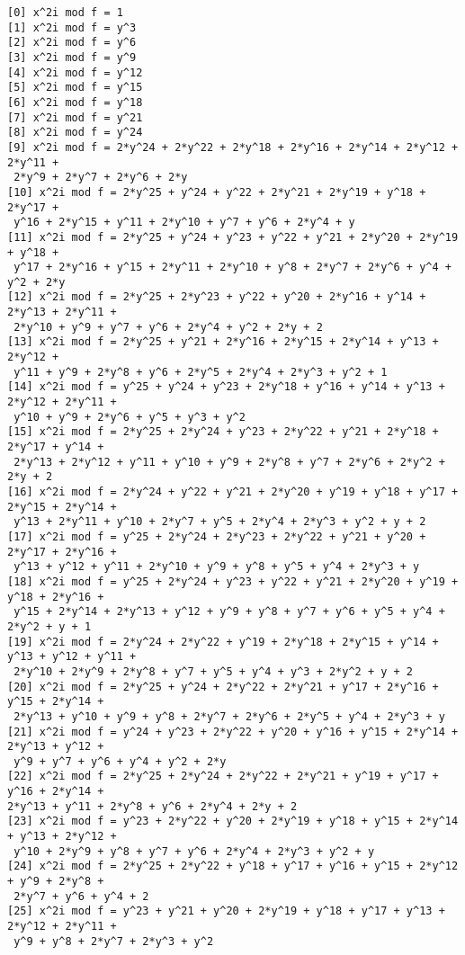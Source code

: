 \documentclass[a4paper]{article}
\begin{document}
\begin{verbatim}
[0] x^2i mod f = 1
[1] x^2i mod f = y^3
[2] x^2i mod f = y^6
[3] x^2i mod f = y^9
[4] x^2i mod f = y^12
[5] x^2i mod f = y^15
[6] x^2i mod f = y^18
[7] x^2i mod f = y^21
[8] x^2i mod f = y^24
[9] x^2i mod f = 2*y^24 + 2*y^22 + 2*y^18 + 2*y^16 + 2*y^14 + 2*y^12 + 2*y^11 +
 2*y^9 + 2*y^7 + 2*y^6 + 2*y
[10] x^2i mod f = 2*y^25 + y^24 + y^22 + 2*y^21 + 2*y^19 + y^18 + 2*y^17 +
 y^16 + 2*y^15 + y^11 + 2*y^10 + y^7 + y^6 + 2*y^4 + y
[11] x^2i mod f = 2*y^25 + y^24 + y^23 + y^22 + y^21 + 2*y^20 + 2*y^19 + y^18 +
 y^17 + 2*y^16 + y^15 + 2*y^11 + 2*y^10 + y^8 + 2*y^7 + 2*y^6 + y^4 + y^2 + 2*y
[12] x^2i mod f = 2*y^25 + 2*y^23 + y^22 + y^20 + 2*y^16 + y^14 + 2*y^13 + 2*y^11 +
 2*y^10 + y^9 + y^7 + y^6 + 2*y^4 + y^2 + 2*y + 2
[13] x^2i mod f = 2*y^25 + y^21 + 2*y^16 + 2*y^15 + 2*y^14 + y^13 + 2*y^12 +
 y^11 + y^9 + 2*y^8 + y^6 + 2*y^5 + 2*y^4 + 2*y^3 + y^2 + 1
[14] x^2i mod f = y^25 + y^24 + y^23 + 2*y^18 + y^16 + y^14 + y^13 + 2*y^12 + 2*y^11 +
 y^10 + y^9 + 2*y^6 + y^5 + y^3 + y^2
[15] x^2i mod f = 2*y^25 + 2*y^24 + y^23 + 2*y^22 + y^21 + 2*y^18 + 2*y^17 + y^14 +
 2*y^13 + 2*y^12 + y^11 + y^10 + y^9 + 2*y^8 + y^7 + 2*y^6 + 2*y^2 + 2*y + 2
[16] x^2i mod f = 2*y^24 + y^22 + y^21 + 2*y^20 + y^19 + y^18 + y^17 + 2*y^15 + 2*y^14 +
 y^13 + 2*y^11 + y^10 + 2*y^7 + y^5 + 2*y^4 + 2*y^3 + y^2 + y + 2
[17] x^2i mod f = y^25 + 2*y^24 + 2*y^23 + 2*y^22 + y^21 + y^20 + 2*y^17 + 2*y^16 +
 y^13 + y^12 + y^11 + 2*y^10 + y^9 + y^8 + y^5 + y^4 + 2*y^3 + y
[18] x^2i mod f = y^25 + 2*y^24 + y^23 + y^22 + y^21 + 2*y^20 + y^19 + y^18 + 2*y^16 +
 y^15 + 2*y^14 + 2*y^13 + y^12 + y^9 + y^8 + y^7 + y^6 + y^5 + y^4 + 2*y^2 + y + 1
[19] x^2i mod f = 2*y^24 + 2*y^22 + y^19 + 2*y^18 + 2*y^15 + y^14 + y^13 + y^12 + y^11 +
 2*y^10 + 2*y^9 + 2*y^8 + y^7 + y^5 + y^4 + y^3 + 2*y^2 + y + 2
[20] x^2i mod f = 2*y^25 + y^24 + 2*y^22 + 2*y^21 + y^17 + 2*y^16 + y^15 + 2*y^14 +
 2*y^13 + y^10 + y^9 + y^8 + 2*y^7 + 2*y^6 + 2*y^5 + y^4 + 2*y^3 + y
[21] x^2i mod f = y^24 + y^23 + 2*y^22 + y^20 + y^16 + y^15 + 2*y^14 + 2*y^13 + y^12 +
 y^9 + y^7 + y^6 + y^4 + y^2 + 2*y
[22] x^2i mod f = 2*y^25 + 2*y^24 + 2*y^22 + 2*y^21 + y^19 + y^17 + y^16 + 2*y^14 + 
2*y^13 + y^11 + 2*y^8 + y^6 + 2*y^4 + 2*y + 2
[23] x^2i mod f = y^23 + 2*y^22 + y^20 + 2*y^19 + y^18 + y^15 + 2*y^14 + y^13 + 2*y^12 +
 y^10 + 2*y^9 + y^8 + y^7 + y^6 + 2*y^4 + 2*y^3 + y^2 + y
[24] x^2i mod f = 2*y^25 + 2*y^22 + y^18 + y^17 + y^16 + y^15 + 2*y^12 + y^9 + 2*y^8 +
 2*y^7 + y^6 + y^4 + 2
[25] x^2i mod f = y^23 + y^21 + y^20 + 2*y^19 + y^18 + y^17 + y^13 + 2*y^12 + 2*y^11 +
 y^9 + y^8 + 2*y^7 + 2*y^3 + y^2
\end{verbatim}
\end{document}
